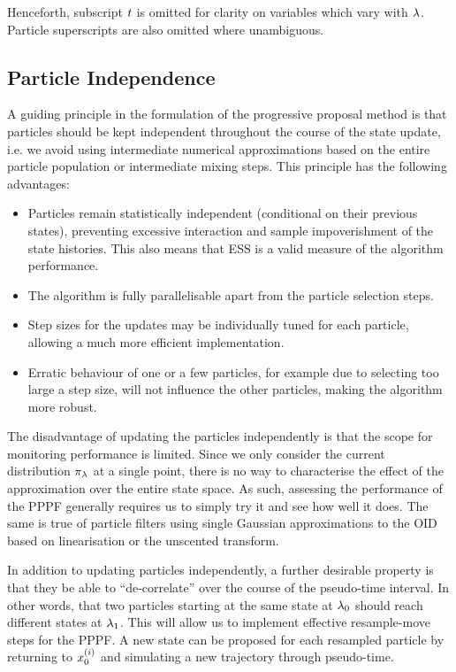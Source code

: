 \documentclass{article}
\begin{document}
Henceforth, subscript $t$ is omitted for clarity on variables which vary with $\lambda$. Particle superscripts are also omitted where unambiguous.



\subsection{Particle Independence} \label{sec:particle_independence}

A guiding principle in the formulation of the progressive proposal method is that particles should be kept independent throughout the course of the state update, i.e. we avoid using intermediate numerical approximations based on the entire particle population or intermediate mixing steps. This principle has the following advantages:
%
\begin{itemize}
  \item Particles remain statistically independent (conditional on their previous states), preventing excessive interaction and sample impoverishment of the state histories. This also means that ESS is a valid measure of the algorithm performance.
  \item The algorithm is fully parallelisable apart from the particle selection steps.
  \item Step sizes for the updates may be individually tuned for each particle, allowing a much more efficient implementation.
  \item Erratic behaviour of one or a few particles, for example due to selecting too large a step size, will not influence the other particles, making the algorithm more robust.
\end{itemize}

The disadvantage of updating the particles independently is that the scope for monitoring performance is limited. Since we only consider the current distribution $\pi_{\lambda}$ at a single point, there is no way to characterise the effect of the approximation over the entire state space. As such, assessing the performance of the PPPF generally requires us to simply try it and see how well it does. The same is true of particle filters using single Gaussian approximations to the OID based on linearisation or the unscented transform.

In addition to updating particles independently, a further desirable property is that they be able to ``de-correlate'' over the course of the pseudo-time interval. In other words, that two particles starting at the same state at $\lambda_0$ should reach different states at $\lambda_1$. This will allow us to implement effective resample-move steps for the PPPF. A new state can be proposed for each resampled particle by returning to $x_{0}^{(i)}$ and simulating a new trajectory through pseudo-time.
\end{document}
